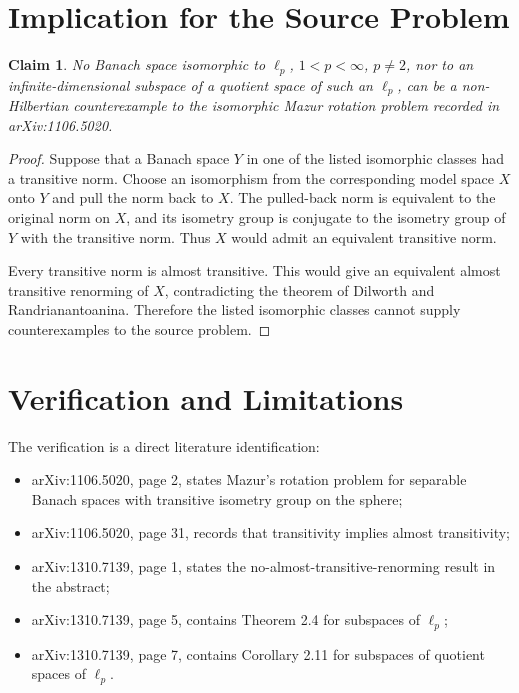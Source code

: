 \documentclass[11pt]{article}
\newtheorem{claim}{Claim}
\begin{document}
\section*{Implication for the Source Problem}

\begin{claim}
No Banach space isomorphic to $\ell_p$, $1<p<\infty$, $p\ne 2$, nor to an
infinite-dimensional subspace of a quotient space of such an $\ell_p$, can be a
non-Hilbertian counterexample to the isomorphic Mazur rotation problem recorded
in arXiv:1106.5020.
\end{claim}

\begin{proof}
Suppose that a Banach space $Y$ in one of the listed isomorphic classes had a
transitive norm. Choose an isomorphism from the corresponding model space $X$
onto $Y$ and pull the norm back to $X$. The pulled-back norm is equivalent to
the original norm on $X$, and its isometry group is conjugate to the isometry
group of $Y$ with the transitive norm. Thus $X$ would admit an equivalent
transitive norm.

Every transitive norm is almost transitive. This would give an equivalent
almost transitive renorming of $X$, contradicting the theorem of Dilworth and
Randrianantoanina. Therefore the listed isomorphic classes cannot supply
counterexamples to the source problem.
\end{proof}

\section*{Verification and Limitations}

The verification is a direct literature identification:
\begin{itemize}
  \item arXiv:1106.5020, page 2, states Mazur's rotation problem for separable
  Banach spaces with transitive isometry group on the sphere;
  \item arXiv:1106.5020, page 31, records that transitivity implies almost
  transitivity;
  \item arXiv:1310.7139, page 1, states the no-almost-transitive-renorming
  result in the abstract;
  \item arXiv:1310.7139, page 5, contains Theorem 2.4 for subspaces of
  $\ell_p$;
  \item arXiv:1310.7139, page 7, contains Corollary 2.11 for subspaces of
  quotient spaces of $\ell_p$.
\end{itemize}
\end{document}
